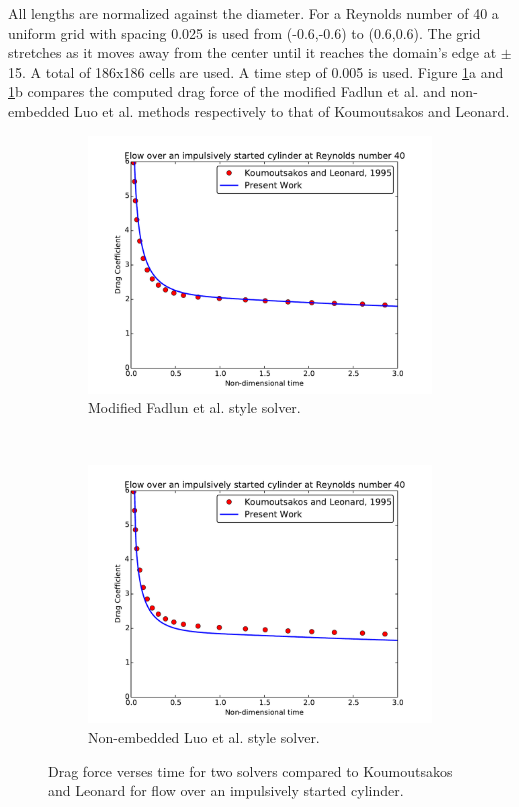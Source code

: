 \documentclass[onehalf,11pt]{beavtex}
\begin{document}
All lengths are normalized against the diameter.
For a Reynolds number of 40 a uniform grid with spacing 0.025 is used from (-0.6,-0.6) to (0.6,0.6).
The grid stretches as it moves away from the center until it reaches the domain's edge at $\pm$ 15.
A total of 186x186 cells are used.
A time step of 0.005 is used.
Figure \ref{fig:cy40}a and \ref{fig:cy40}b compares the computed drag force of the modified Fadlun et al. and non-embedded Luo et al. methods respectively to that of Koumoutsakos and Leonard.
\begin{figure}[h]
	\centering
	\begin{subfigure}{0.4\textwidth}
		\includegraphics[width=\linewidth]{cy40fadlun}
		\caption{Modified Fadlun et al. style solver.}
	\end{subfigure}
	~
	\begin{subfigure}{0.4\textwidth}
		\includegraphics[width=\linewidth]{cy40luo}
		\caption{Non-embedded Luo et al. style solver.}
	\end{subfigure}
	\caption{Drag force verses time for two solvers compared to Koumoutsakos and Leonard for flow over an impulsively started cylinder.}
	\label{fig:cy40}
\end{figure}
\end{document}
